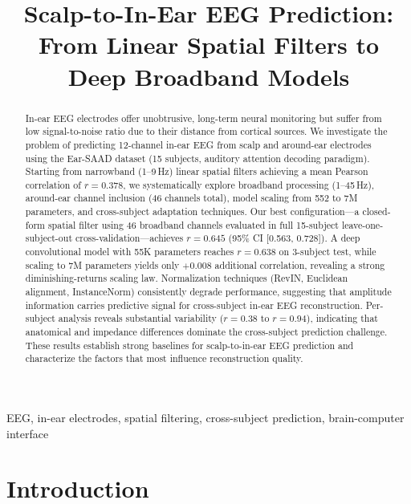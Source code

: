 \documentclass[conference]{IEEEtran}
\begin{document}
\title{Scalp-to-In-Ear EEG Prediction:\\From Linear Spatial Filters to Deep Broadband Models}

\author{
}

\maketitle

\begin{abstract}
In-ear EEG electrodes offer unobtrusive, long-term neural monitoring but suffer from low signal-to-noise ratio due to their distance from cortical sources. We investigate the problem of predicting 12-channel in-ear EEG from scalp and around-ear electrodes using the Ear-SAAD dataset (15 subjects, auditory attention decoding paradigm). Starting from narrowband (1--9\,Hz) linear spatial filters achieving a mean Pearson correlation of $r = 0.378$, we systematically explore broadband processing (1--45\,Hz), around-ear channel inclusion (46 channels total), model scaling from 552 to 7M parameters, and cross-subject adaptation techniques. Our best configuration---a closed-form spatial filter using 46 broadband channels evaluated in full 15-subject leave-one-subject-out cross-validation---achieves $r = 0.645$ (95\% CI [0.563, 0.728]). A deep convolutional model with 55K parameters reaches $r = 0.638$ on 3-subject test, while scaling to 7M parameters yields only $+0.008$ additional correlation, revealing a strong diminishing-returns scaling law. Normalization techniques (RevIN, Euclidean alignment, InstanceNorm) consistently degrade performance, suggesting that amplitude information carries predictive signal for cross-subject in-ear EEG reconstruction. Per-subject analysis reveals substantial variability ($r = 0.38$ to $r = 0.94$), indicating that anatomical and impedance differences dominate the cross-subject prediction challenge. These results establish strong baselines for scalp-to-in-ear EEG prediction and characterize the factors that most influence reconstruction quality.
\end{abstract}

\begin{IEEEkeywords}
EEG, in-ear electrodes, spatial filtering, cross-subject prediction, brain-computer interface
\end{IEEEkeywords}

\section{Introduction}
\label{sec:introduction}
\end{document}
